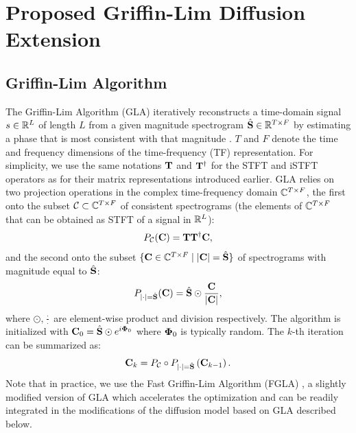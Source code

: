 \section{Proposed Griffin-Lim Diffusion Extension}
\label{sec:GLA-Grad}


\subsection{Griffin-Lim Algorithm}

The Griffin-Lim Algorithm (GLA) \cite{griffin1984signal} iteratively reconstructs a time-domain signal $s\in{\mathbb R}^{L}$ of length $L$ from a given magnitude spectrogram $\hat{\mathbf{S}}\in {\mathbb R}^{T\times F}$ by estimating a phase that is most consistent with that magnitude \cite{LeRoux2008SAPA09b}. $T$ and $F$ denote the time and frequency dimensions of the time-frequency (TF) representation.
For simplicity, we use the same notations $\mathbf{T}$ and $\mathbf{T}^{\dagger}$ for the STFT and iSTFT operators as for their matrix representations introduced earlier.
GLA relies on two projection operations in the complex time-frequency domain ${\mathbb C}^{T\times F}$,
the first onto the subset $\mathcal{C}\subset {\mathbb C}^{T\times F}$ of consistent spectrograms (the elements of  ${\mathbb C}^{T\times F}$ that can be obtained as STFT of a signal in ${\mathbb R}^{L}$):
\begin{equation}
P_{\mathcal{C}}(\mathbf{C})=\mathbf{T}\mathbf{T}^{\dagger} \mathbf{C},
\label{eq:Pc1}
\end{equation}
and the second onto the subset $\{\mathbf{C} \in {\mathbb C}^{T\times F} \mid |\mathbf{C}|=\hat{\mathbf{S}} \}$ of spectrograms with magnitude equal to $\hat{\mathbf{S}}$: 
\begin{equation} 
P_{|\cdot|=\hat{\mathbf{S}}}(\mathbf{C})=\hat{\mathbf{S}} \odot \frac{\mathbf{C}}{\left|\mathbf{C}\right|},
\label{eq:Pc2}
\end{equation} 
where $\odot, \frac{\cdot}{\cdot}$ are element-wise product and division respectively. %
The algorithm is initialized with $\mathbf{C}_0=\hat{\mathbf{S}}\odot e^{i\boldsymbol{\Phi}_0}$ where $\boldsymbol{\Phi}_0$ is typically random.
The $k$-th iteration can be summarized as: %
\begin{equation}
\mathbf{C}_k=P_{\mathcal{C}} \circ P_{|\cdot|=\hat{\mathbf{S}}}\left(\mathbf{C}_{k-1}\right).
\label{eq:GLA}
\end{equation}
Note that in practice, we use the Fast Griffin-Lim Algorithm (FGLA) \cite{perraudin2013fast}, a slightly modified version of GLA which accelerates the optimization and can be readily integrated in the modifications of the diffusion model based on GLA described below.


